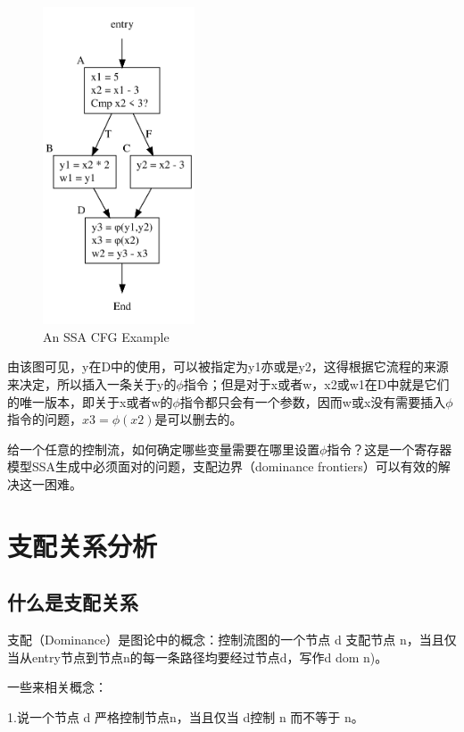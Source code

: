 \begin{figure}[htb]
  \centering
  \includegraphics[width=0.4\textwidth]{figures/genphi.pdf}
  \caption{An SSA CFG Example}
  \label{fig:genphi}
\end{figure}

由该图可见，y在D中的使用，可以被指定为y1亦或是y2，这得根据它流程的来源来决定，所以插入一条关于y的$\phi$指令；但是对于x或者w，x2或w1在D中就是它们的唯一版本，即关于x或者w的$\phi$指令都只会有一个参数，因而w或x没有需要插入$\phi$指令的问题，$x3=\phi(x2)$是可以删去的。

给一个任意的控制流，如何确定哪些变量需要在哪里设置$\phi$指令？这是一个寄存器模型SSA生成中必须面对的问题，支配边界（dominance frontiers）可以有效的解决这一困难。

\section{支配关系分析} 

\subsection{什么是支配关系}

支配（Dominance）是图论中的概念：控制流图的一个节点 d 支配节点 n，当且仅当从entry节点到节点n的每一条路径均要经过节点d，写作d dom n)。

一些来相关概念：

1.说一个节点 d 严格控制节点n，当且仅当 d控制 n 而不等于 n。

